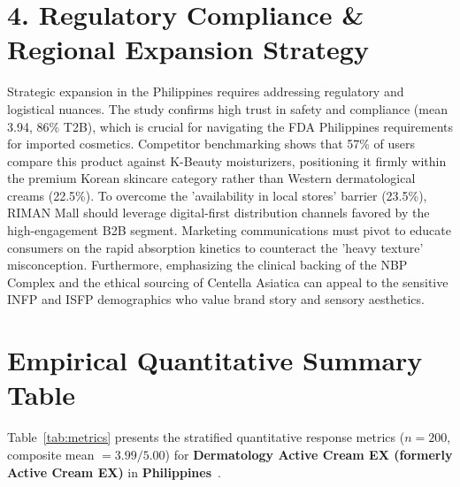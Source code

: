 \documentclass[10pt,twocolumn,a4paper]{article}
\begin{document}
\section{4. Regulatory Compliance \& Regional Expansion Strategy}
Strategic expansion in the Philippines requires addressing regulatory and logistical nuances. The study confirms high trust in safety and compliance (mean 3.94, 86\% T2B), which is crucial for navigating the FDA Philippines requirements for imported cosmetics. Competitor benchmarking shows that 57\% of users compare this product against K-Beauty moisturizers, positioning it firmly within the premium Korean skincare category rather than Western dermatological creams (22.5\%). To overcome the 'availability in local stores' barrier (23.5\%), RIMAN Mall should leverage digital-first distribution channels favored by the high-engagement B2B segment. Marketing communications must pivot to educate consumers on the rapid absorption kinetics to counteract the 'heavy texture' misconception. Furthermore, emphasizing the clinical backing of the NBP Complex and the ethical sourcing of Centella Asiatica can appeal to the sensitive INFP and ISFP demographics who value brand story and sensory aesthetics.


\section{Empirical Quantitative Summary Table}
Table~\ref{tab:metrics} presents the stratified quantitative response metrics ($n = 200$, composite mean $= 3.99/5.00$) for \textbf{Dermatology Active Cream EX (formerly Active Cream EX)} in \textbf{Philippines}~\cite{ref_kaggle_doi,ref_hf_doi}.
\end{document}
